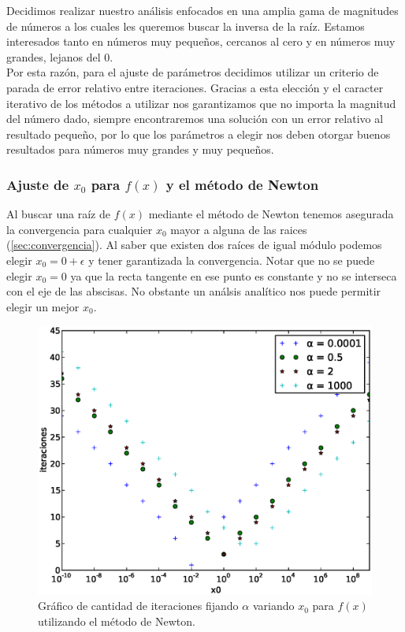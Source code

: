 Decidimos realizar nuestro análisis enfocados en una amplia gama de magnitudes
de números a los cuales les queremos buscar la inversa de la raíz. Estamos
interesados tanto en números muy pequeños, cercanos al cero y en números muy
grandes, lejanos del 0.\\

Por esta razón, para el ajuste de parámetros decidimos utilizar un criterio de
parada de error relativo entre iteraciones. Gracias a esta elección y el
caracter iterativo de los métodos a utilizar nos garantizamos que no importa la
magnitud del número dado, siempre encontraremos una solución con un error
relativo al resultado pequeño, por lo que los parámetros a elegir nos deben
otorgar buenos resultados para números muy grandes y muy pequeños.

\subsubsection{Ajuste de $x_0$ para $f(x)$ y el método de Newton}

Al buscar una raíz de $f(x)$ mediante el método de Newton tenemos asegurada la
convergencia para cualquier $x_0$ mayor a alguna de las raices
(\ref{sec:convergencia}). Al saber que existen dos raíces de igual módulo
podemos elegir $x_0 = 0 + \epsilon$ y tener garantizada la convergencia. Notar
que no se puede elegir $x_0 = 0$ ya que la recta tangente en ese punto es
constante y no se interseca con el eje de las abscisas. No obstante un análsis
analítico nos puede permitir elegir un mejor $x_0$.\\

\begin{figure}[!htbp]
  \begin{center}
    \includegraphics[scale=0.5]{graficos/new/f_newton_x0_variable.eps}
    \caption{\label{fig:f_newton_x0_variable} Gráfico de cantidad de iteraciones fijando $\alpha$ variando $x_0$ para $f(x)$ utilizando el método de Newton.}
  \end{center}
\end{figure}

